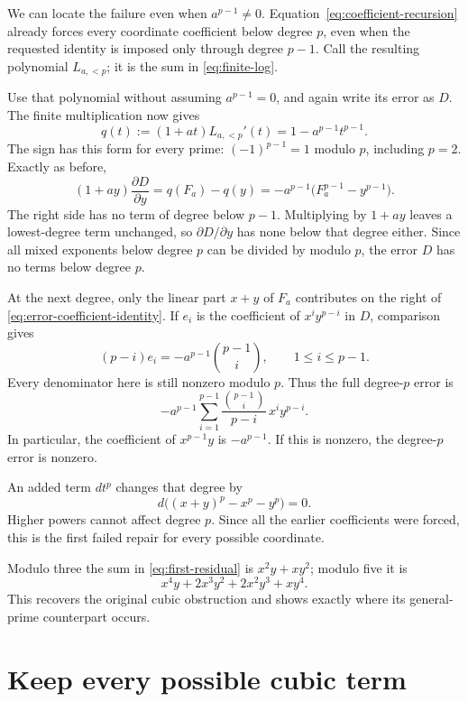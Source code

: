 \documentclass[11pt,letterpaper]{article}
\numberwithin{equation}{section}
\theoremstyle{definition}\newtheorem{example}[theorem]{Example}
\begin{document}
We can locate the failure even when \(a^{p-1}\ne0\). Equation~\eqref{eq:coefficient-recursion} already forces every coordinate coefficient below degree \(p\), even when the requested identity is imposed only through degree \(p-1\). Call the resulting polynomial \(L_{a,<p}\); it is the sum in \eqref{eq:finite-log}.

Use that polynomial without assuming \(a^{p-1}=0\), and again write its error as \(D\). The finite multiplication now gives
\[
 q(t):=(1+at)L_{a,<p}'(t)=1-a^{p-1}t^{p-1}.
\]
The sign has this form for every prime: \((-1)^{p-1}=1\) modulo \(p\), including \(p=2\). Exactly as before,
\begin{equation}\label{eq:error-coefficient-identity}
 (1+ay)\frac{\partial D}{\partial y}
 =q(F_a)-q(y)
 =-a^{p-1}\bigl(F_a^{p-1}-y^{p-1}\bigr).
\end{equation}
The right side has no term of degree below \(p-1\). Multiplying by \(1+ay\) leaves a lowest-degree term unchanged, so \(\partial D/\partial y\) has none below that degree either. Since all mixed exponents below degree \(p\) can be divided by modulo \(p\), the error \(D\) has no terms below degree \(p\).

At the next degree, only the linear part \(x+y\) of \(F_a\) contributes on the right of \eqref{eq:error-coefficient-identity}. If \(e_i\) is the coefficient of \(x^iy^{p-i}\) in \(D\), comparison gives
\[
 (p-i)e_i=-a^{p-1}\binom{p-1}{i},\qquad 1\le i\le p-1.
\]
Every denominator here is still nonzero modulo \(p\). Thus the full degree-\(p\) error is
\begin{equation}\label{eq:first-residual}
 -a^{p-1}\sum_{i=1}^{p-1}
 \frac{\binom{p-1}{i}}{p-i}\,x^iy^{p-i}.
\end{equation}
In particular, the coefficient of \(x^{p-1}y\) is \(-a^{p-1}\). If this is nonzero, the degree-\(p\) error is nonzero.

An added term \(d t^p\) changes that degree by
\[
 d\bigl((x+y)^p-x^p-y^p\bigr)=0.
\]
Higher powers cannot affect degree \(p\). Since all the earlier coefficients were forced, this is the first failed repair for every possible coordinate.

Modulo three the sum in \eqref{eq:first-residual} is \(x^2y+xy^2\); modulo five it is
\[
 x^4y+2x^3y^2+2x^2y^3+xy^4.
\]
This recovers the original cubic obstruction and shows exactly where its general-prime counterpart occurs.



\section{Keep every possible cubic term}\label{sec:cubic-laws}
\end{document}
